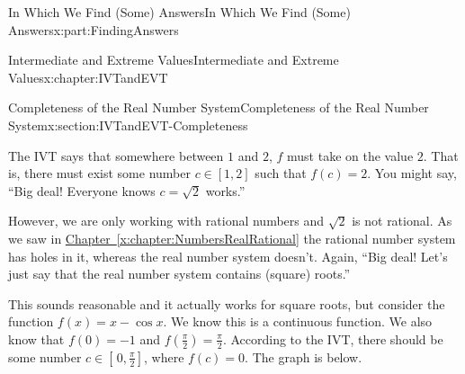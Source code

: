 \documentclass[oneside,10pt,]{book}
\newcommand{\xreffont}{\relax}
\numberwithin{equation}{section}
\begin{document}
\begin{partptx}{In Which We Find (Some) Answers}{}{In Which We Find (Some) Answers}{}{}{x:part:FindingAnswers}
\begin{chapterptx}{Intermediate and Extreme Values}{}{Intermediate and Extreme Values}{}{}{x:chapter:IVTandEVT}
\begin{sectionptx}{Completeness of the Real Number System}{}{Completeness of the Real Number System}{}{}{x:section:IVTandEVT-Completeness}
\begin{image}{0.315}{0.37}{0.315}
\end{image}%
The IVT says that somewhere between \(1\) and \(2\), \(f\) must take on the value \(2\). That is, there must exist some number \(c\in[1,2]\) such that \(f(c)=2\). You might say, ``Big deal! Everyone knows \(c=\sqrt{2}\) works.''%
\par
However, we are only working with rational numbers and \(\sqrt{2}\) \(\)is not rational. As we saw in \hyperref[x:chapter:NumbersRealRational]{Chapter~{\xreffont\ref{x:chapter:NumbersRealRational}}} the rational number system has holes in it, whereas the real number system doesn't. Again, ``Big deal! Let's just say that the real number system contains (square) roots.''%
\par
This sounds reasonable and it actually works for square roots, but consider the function \(f(x)=x-\cos x\). We know this is a continuous function. We also know that \(f(0)=-1\) and \(f(\frac{\pi}{2})=\frac{\pi}{2}\). According to the IVT, there should be some number \(c\in[\,0,\frac{\pi}{2}]\), where \(f(c)=0\). The graph is below.%
\begin{image}{0.315}{0.37}{0.315}%

\end{image}
\end{sectionptx}
\end{chapterptx}
\end{partptx}
\end{document}
